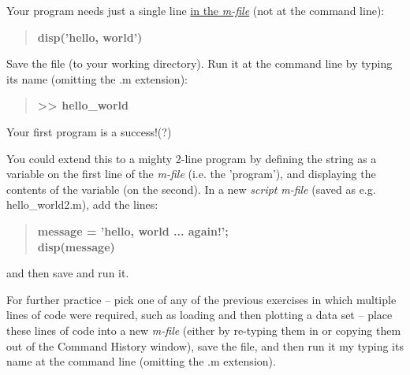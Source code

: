 \documentclass{tufte-book} %
\newenvironment{docspec}{\begin{quotation}\ttfamily\parskip0pt\parindent0pt\ignorespaces}{\end{quotation}}
\newenvironment{docspecbold}{\begin{quotation}\ttfamily\bfseries\parskip0pt\parindent0pt\ignorespaces}{\end{quotation}}
\begin{document}
Your program needs just a single line \uline{in the \textit{m-file}} (not at the command line):
\begin{docspec}
\textbf{disp('hello, world')}
\end{docspec}
\noindent Save the file (to your working directory). Run it at the command line by typing its name (omitting the \textsf{.m} extension):
\begin{docspec}
\textbf{>> hello\_world}
\end{docspec}

 Your first program is a success!(?) 

You could extend this to a mighty 2-line program by defining the string as a variable on the first line of the \textit{m-file} (i.e. the 'program'), and displaying the contents of the variable (on the second). In a new \textit{script} \textit{m-file} (saved as e.g. \textsf{hello\_world2.m}), add the lines:
\begin{docspecbold}
message = 'hello, world ... again!';
\\disp(message)
\end{docspecbold}

\noindent and then save and run it.

For further practice -- pick one of any of the previous exercises in which multiple lines of code were required, such as loading and then plotting a data set -- place these lines of code into a new \textit{m-file }(either by re-typing them in or copying them out of the \textsf{Command History window}), save the file, and then run it my typing its name at the command line (omitting the \textsf{.m} extension).
\end{document}
